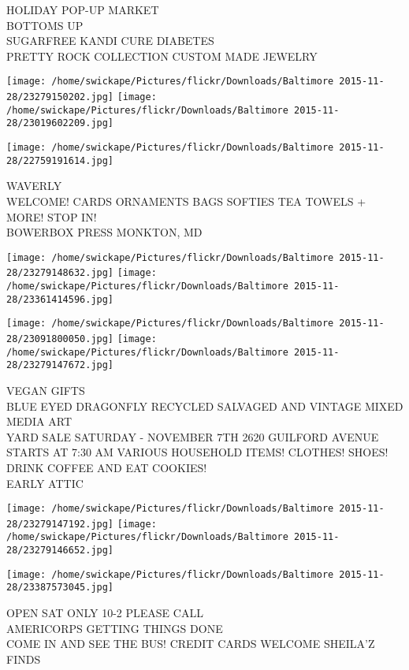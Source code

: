 \documentclass[10pt,letterpaper]{article}
\begin{document}
HOLIDAY POP{-}UP MARKET\\
BOTTOMS UP\\
SUGARFREE KANDI CURE DIABETES\\
PRETTY ROCK COLLECTION CUSTOM MADE JEWELRY
\pagebreak

\texttt{[image: /home/swickape/Pictures/flickr/Downloads/Baltimore 2015-11-28/23279150202.jpg]}
\texttt{[image: /home/swickape/Pictures/flickr/Downloads/Baltimore 2015-11-28/23019602209.jpg]}

\vspace{0.25in}
\texttt{[image: /home/swickape/Pictures/flickr/Downloads/Baltimore 2015-11-28/22759191614.jpg]}

WAVERLY\\
WELCOME!  CARDS ORNAMENTS BAGS SOFTIES TEA TOWELS + MORE! STOP IN!\\
BOWERBOX PRESS MONKTON, MD
\pagebreak

\texttt{[image: /home/swickape/Pictures/flickr/Downloads/Baltimore 2015-11-28/23279148632.jpg]}
\texttt{[image: /home/swickape/Pictures/flickr/Downloads/Baltimore 2015-11-28/23361414596.jpg]}

\texttt{[image: /home/swickape/Pictures/flickr/Downloads/Baltimore 2015-11-28/23091800050.jpg]}
\texttt{[image: /home/swickape/Pictures/flickr/Downloads/Baltimore 2015-11-28/23279147672.jpg]}

VEGAN GIFTS\\
BLUE EYED DRAGONFLY RECYCLED SALVAGED AND VINTAGE MIXED MEDIA ART\\
YARD SALE SATURDAY {-} NOVEMBER 7TH 2620 GUILFORD AVENUE STARTS AT 7:30 AM VARIOUS HOUSEHOLD ITEMS!  CLOTHES!  SHOES!  DRINK COFFEE AND EAT COOKIES!\\
EARLY ATTIC
\pagebreak

\texttt{[image: /home/swickape/Pictures/flickr/Downloads/Baltimore 2015-11-28/23279147192.jpg]}
\texttt{[image: /home/swickape/Pictures/flickr/Downloads/Baltimore 2015-11-28/23279146652.jpg]}

\texttt{[image: /home/swickape/Pictures/flickr/Downloads/Baltimore 2015-11-28/23387573045.jpg]}

OPEN SAT ONLY 10{-}2 PLEASE CALL\\
AMERICORPS GETTING THINGS DONE\\
COME IN AND SEE THE BUS!  CREDIT CARDS WELCOME SHEILA'Z FINDS
\pagebreak
\end{document}
